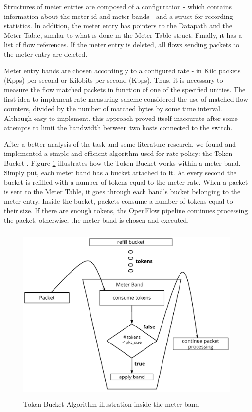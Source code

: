     Structures of meter entries are composed of a configuration - which contains information about the meter id and meter bands - and a struct for recording statistics. In addition, the meter entry has pointers to the Datapath and the Meter Table, similar to what is done in the Meter Table struct. Finally, it has a list of flow references. If the meter entry is deleted, all flows sending packets to the meter entry are deleted. 

    Meter entry bands are chosen accordingly to a configured rate - in Kilo packets (Kpps) per second or Kilobits per second (Kbps). Thus, it is necessary to measure the flow matched packets in function of one of the specified unities. The first idea to implement rate measuring scheme considered the use of matched flow counters, divided by the number of matched bytes by some time interval. Although easy to implement, this approach proved itself inaccurate after some attempts to limit the bandwidth between two hosts connected to the switch.  
    
    After a better analysis of the task and some literature research, we found and implemented a simple and efficient algorithm used for rate policy: the Token Bucket \cite{Tanenbaum:2002:CN:572404}. Figure \ref{fig:tokenbucket} illustrates how the Token Bucket works within a meter band. Simply put, each meter band has a bucket attached to it. At every second the bucket is refilled with a number of tokens equal to the meter rate. When a packet is sent to the Meter Table, it goes through each band's bucket belonging to the meter entry. Inside the bucket, packets consume a number of tokens equal to their size. If there are enough tokens, the OpenFlow pipeline continues processing the packet, otherwise, the meter band is chosen and executed.               

    \begin{figure}[h]
    \centering
    \includegraphics[height=9cm,width=\textwidth,keepaspectratio]{eps/TokenBucket.pdf}
    \caption{Token Bucket Algorithm illustration inside the meter band}
    \label{fig:tokenbucket}
    \end{figure}

